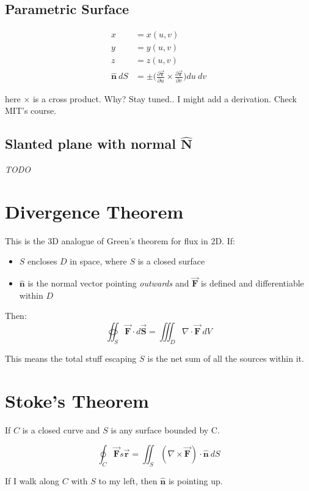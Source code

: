 \documentclass{article}
\newcommand{\der}{\partial}
\newcommand{\bm}[1]{\mathbf{#1}}
\newcommand{\vf}[1]{\vec{\mathbf{#1}}}
\newcommand{\norm}{\hat{\bm{n}}}
\begin{document}
\subsection{Parametric Surface}
\begin{align*}
    x &= x(u, v) \\
    y &= y(u, v) \\
    z &= z(u, v) \\
    \norm\ dS &= \pm
        \bigg(\frac{\der \vf{r}}{\der u}
            \times \frac{\der \vf{r}}{\der v} \bigg) du\ dv
\end{align*}

here $\times$ is a cross product. Why? Stay tuned.. I might add a derivation. Check MIT's course.

\subsection{Slanted plane with normal $\mathbf{\hat{N}}$}
\textit{TODO}

\section{Divergence Theorem}
This is the 3D analogue of Green's theorem for flux in 2D. If:

\begin{itemize}
    \item $S$ encloses $D$ in space, where $S$ is a closed surface
    \item $\norm$ is the normal vector pointing
        \textit{outwards} and $\vf{F}$ is defined and differentiable within $D$
\end{itemize}

Then:
\begin{equation}
    \oiint_S \vf{F} \cdot d\vf{S} = \iiint_D \nabla \cdot \vf{F}\ dV
\end{equation}

This means the total stuff escaping $S$ is the net sum of all the sources within it.

\section{Stoke's Theorem}
If $C$ is a closed curve and $S$ is any surface bounded by C.

\begin{equation}
    \oint_C \vf{F} s\vf{r} = \iint_S (\nabla \times \vf{F}) \cdot \norm \ dS
\end{equation}

If I walk along $C$ with $S$ to my left, then $\norm$ is pointing up.
\end{document}
